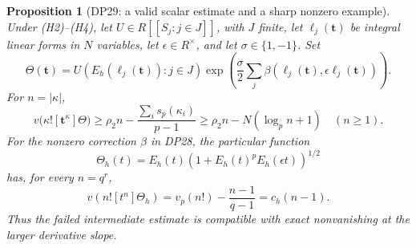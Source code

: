 \documentclass[11pt,a4paper]{article}
\newtheorem{proposition}[theorem]{Proposition}
\theoremstyle{definition}\newtheorem{remark}[theorem]{Remark}
\begin{document}
\begin{proposition}[DP29: a valid scalar estimate and a sharp nonzero example]\label{DP29}
Under (H2)--(H4), let $U\in R[[S_j:j\in J]]$, with $J$ finite, let $\ell_j(\mathbf t)$ be integral linear forms in $N$ variables, let $\epsilon\in R^\times$, and let $\sigma\in\{1,-1\}$. Set
\[
 \Theta(\mathbf t)=U(E_h(\ell_j(\mathbf t)):j\in J)
 \exp\left(\frac\sigma2\sum_j\beta(\ell_j(\mathbf t),\epsilon\ell_j(\mathbf t))\right).
\]
For $n=|\kappa|$,
\begin{equation}\label{eq:scalar-old-residual}
 v\bigl(\kappa![\mathbf t^\kappa]\Theta\bigr)
 \ge \rho_2n-\frac{\sum_i s_p(\kappa_i)}{p-1}
 \ge\rho_2n-N(\log_p n+1)\quad(n\ge1).
\end{equation}
For the nonzero correction $\beta$ in DP28, the particular function
\[
 \Theta_h(t)=E_h(t)\left(1+E_h(t)^pE_h(\epsilon t)\right)^{1/2}
\]
has, for every $n=q^r$,
\begin{equation}\label{eq:sharp-corrected-scalar}
 v(n![t^n]\Theta_h)=v_p(n!)-\frac{n-1}{q-1}=c_h(n-1).
\end{equation}
Thus the failed intermediate estimate is compatible with exact nonvanishing at the larger derivative slope.
\end{proposition}
\end{document}
